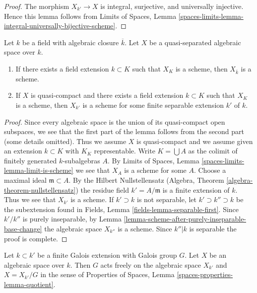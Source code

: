 \begin{proof}
The morphism $X_{k'} \to X$ is integral, surjective, and
universally injective. Hence this lemma follows from
Limits of Spaces, Lemma
\ref{spaces-limits-lemma-integral-universally-bijective-scheme}.
\end{proof}

\begin{lemma}
\label{lemma-when-scheme-after-base-change}
Let $k$ be a field with algebraic closure $\overline{k}$.
Let $X$ be a quasi-separated algebraic space over $k$.
\begin{enumerate}
\item If there exists a field extension $k \subset K$ such that
$X_K$ is a scheme, then $X_{\overline{k}}$ is a scheme.
\item If $X$ is quasi-compact and there exists a field extension
$k \subset K$ such that $X_K$ is a scheme, then $X_{k'}$
is a scheme for some finite separable extension $k'$ of $k$.
\end{enumerate}
\end{lemma}

\begin{proof}
Since every algebraic space is the union of its quasi-compact open
subspaces, we see that the first part of the lemma follows from
the second part (some details omitted). Thus we assume $X$ is quasi-compact
and we assume given an extension $k \subset K$ with $K_K$ representable.
Write $K = \bigcup A$ as the colimit of finitely generated $k$-subalgebras
$A$. By Limits of Spaces, Lemma \ref{spaces-limits-lemma-limit-is-scheme}
we see that $X_A$ is a scheme for some $A$. Choose a maximal ideal
$\mathfrak m \subset A$. By the Hilbert Nullstellensatz
(Algebra, Theorem \ref{algebra-theorem-nullstellensatz})
the residue field $k' = A/\mathfrak m$ is a finite extension of $k$.
Thus we see that $X_{k'}$ is a scheme. If $k' \supset k$ is not
separable, let $k' \supset k'' \supset k$ be the subextension
found in Fields, Lemma \ref{fields-lemma-separable-first}.
Since $k'/k''$ is purely inseparable, by
Lemma \ref{lemma-scheme-after-purely-inseparable-base-change}
the algebraic space $X_{k''}$ is a scheme. Since $k''|k$ is separable
the proof is complete.
\end{proof}

\begin{lemma}
\label{lemma-base-change-by-Galois}
Let $k \subset k'$ be a finite Galois extension with Galois group $G$.
Let $X$ be an algebraic space over $k$. Then $G$ acts freely on the
algebraic space $X_{k'}$ and $X = X_{k'}/G$ in the sense of
Properties of Spaces, Lemma \ref{spaces-properties-lemma-quotient}.
\end{lemma}

